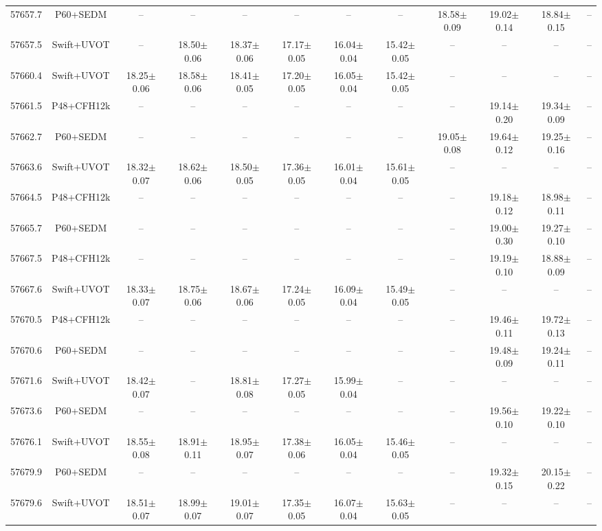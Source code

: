 \begin{tabular}{rccccccccccc}
 57657.7 & P60+SEDM& -- & -- & -- & -- & -- & -- & 18.58$\pm$0.09 & 19.02$\pm$0.14 & 18.84$\pm$0.15 & --\\
 57657.5 & Swift+UVOT & -- & 18.50$\pm$0.06 & 18.37$\pm$0.06 & 17.17$\pm$0.05 & 16.04$\pm$0.04 & 15.42$\pm$0.05 & -- & -- & -- & --\\
 57660.4 & Swift+UVOT & 18.25$\pm$0.06 & 18.58$\pm$0.06 & 18.41$\pm$0.05 & 17.20$\pm$0.05 & 16.05$\pm$0.04 & 15.42$\pm$0.05 & -- & -- & -- & --\\
 57661.5 & P48+CFH12k & -- & -- & -- & -- & -- & -- & -- & 19.14$\pm$0.20 & 19.34$\pm$0.09 & --\\
 57662.7 & P60+SEDM& -- & -- & -- & -- & -- & -- & 19.05$\pm$0.08 & 19.64$\pm$0.12 & 19.25$\pm$0.16 & --\\
 57663.6 & Swift+UVOT & 18.32$\pm$0.07 & 18.62$\pm$0.06 & 18.50$\pm$0.05 & 17.36$\pm$0.05 & 16.01$\pm$0.04 & 15.61$\pm$0.05 & -- & -- & -- & --\\
 57664.5 & P48+CFH12k & -- & -- & -- & -- & -- & -- & -- & 19.18$\pm$0.12 & 18.98$\pm$0.11 & --\\
 57665.7 & P60+SEDM& -- & -- & -- & -- & -- & -- & -- & 19.00$\pm$0.30 & 19.27$\pm$0.10 & --\\
 57667.5 & P48+CFH12k & -- & -- & -- & -- & -- & -- & -- & 19.19$\pm$0.10 & 18.88$\pm$0.09 & --\\
 57667.6 & Swift+UVOT & 18.33$\pm$0.07 & 18.75$\pm$0.06 & 18.67$\pm$0.06 & 17.24$\pm$0.05 & 16.09$\pm$0.04 & 15.49$\pm$0.05 & -- & -- & -- & --\\
 57670.5 & P48+CFH12k & -- & -- & -- & -- & -- & -- & -- & 19.46$\pm$0.11 & 19.72$\pm$0.13 & --\\
 57670.6 & P60+SEDM& -- & -- & -- & -- & -- & -- & -- & 19.48$\pm$0.09 & 19.24$\pm$0.11 & --\\
 57671.6 & Swift+UVOT & 18.42$\pm$0.07 & -- & 18.81$\pm$0.08 & 17.27$\pm$0.05 & 15.99$\pm$0.04 & -- & -- & -- & -- & --\\
 57673.6 & P60+SEDM& -- & -- & -- & -- & -- & -- & -- & 19.56$\pm$0.10 & 19.22$\pm$0.10 & --\\
 57676.1 & Swift+UVOT & 18.55$\pm$0.08 & 18.91$\pm$0.11 & 18.95$\pm$0.07 & 17.38$\pm$0.06 & 16.05$\pm$0.04 & 15.46$\pm$0.05 & -- & -- & -- & --\\
 57679.9 & P60+SEDM& -- & -- & -- & -- & -- & -- & -- & 19.32$\pm$0.15 & 20.15$\pm$0.22 & --\\
 57679.6 & Swift+UVOT & 18.51$\pm$0.07 & 18.99$\pm$0.07 & 19.01$\pm$0.07 & 17.35$\pm$0.05 & 16.07$\pm$0.04 & 15.63$\pm$0.05 & -- & -- & -- & --\\

\end{tabular}
